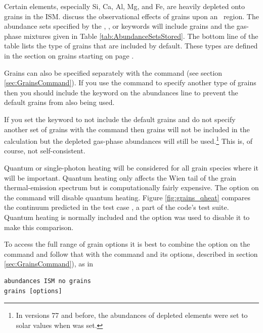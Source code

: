 Certain elements, especially Si, Ca, Al, Mg, and Fe,
are heavily depleted
onto grains in the ISM.
\citet{KingdonFerlandFeibelman1995} discuss the observational
effects of grains upon an \hii\ region.
The abundance sets specified by the
,
, or  keywords
will include grains and the gas-phase
mixtures given in Table \ref{tab:AbundanceSetsStored}.
The bottom line of the table lists the type
of grains that are included by default.
These types are defined in the section on grains
starting on page \pageref{sec:GrainsCommand}.

Grains can also be specified separately with the
 command (see section \ref{sec:GrainsCommand}).
If you use the  command to specify another type
of grains then you should include the keyword
 on the abundances
line to prevent the default grains from also being used.

If you set the keyword  to not include
the default grains and
do not specify another set of grains with the
 command then grains
will not be included in the calculation but the depleted
gas-phase abundances
will still be used.\footnote{In versions 77 and before,
the abundances of depleted elements were
set to solar values when  was set.}
This is, of course, not self-consistent.

Quantum or single-photon heating will be considered for all
grain species where it will be important.
Quantum heating only affects the Wien tail of the grain
thermal-emission spectrum but is computationally fairly expensive.
The  option on the  command
will disable quantum heating.
Figure \ref{fig:grains_qheat} compares the continuum predicted
in the test case ,
a part of the code's test suite.
Quantum heating is normally
included and the  option was used to
disable it to make this comparison.

To access the full range of grain options it is best to combine the 
option on the  command and follow that with
the  command and its options,
described in section \ref{sec:GrainsCommand}), as in
\begin{verbatim}
abundances ISM no grains
grains [options]
\end{verbatim}

